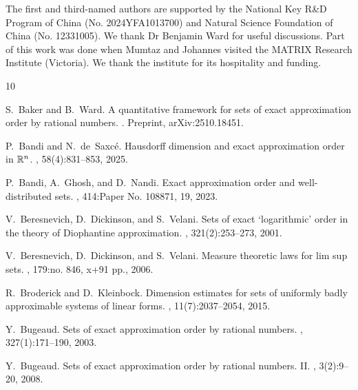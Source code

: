 \documentclass[11pt]{amsart}
\numberwithin{equation}{section}
\newcommand{\0}{\mathbf{0}}
\theoremstyle{remark}
\begin{document}
{\medskip

 The first and third-named authors are supported by the National Key R\&D Program of China (No. 2024YFA1013700) and Natural Science Foundation of China (No. 12331005). We thank Dr Benjamin Ward for useful discussions. Part of this work was done when Mumtaz and Johannes visited the MATRIX Research Institute (Victoria). We thank the institute for its hospitality and funding.


% 

% 

\begin{thebibliography}{10}

S.~Baker and B.~Ward.
\newblock A quantitative framework for sets of exact approximation order by
  rational numbers.
.
\newblock Preprint, arXiv:2510.18451.

P.~Bandi and N.~de~Saxc\'e.
\newblock Hausdorff dimension and exact approximation order in {$\Bbb R^n$}.
, 58(4):831--853, 2025.

P.~Bandi, A.~Ghosh, and D.~Nandi.
\newblock Exact approximation order and well-distributed sets.
, 414:Paper No. 108871, 19, 2023.

V.~Beresnevich, D.~Dickinson, and S.~Velani.
\newblock Sets of exact `logarithmic' order in the theory of {D}iophantine
  approximation.
, 321(2):253--273, 2001.

V.~Beresnevich, D.~Dickinson, and S.~Velani.
\newblock Measure theoretic laws for lim sup sets.
, 179:no. 846, x+91 pp., 2006.

R.~Broderick and D.~Kleinbock.
\newblock Dimension estimates for sets of uniformly badly approximable systems
  of linear forms.
, 11(7):2037--2054, 2015.

Y.~Bugeaud.
\newblock Sets of exact approximation order by rational numbers.
, 327(1):171--190, 2003.

Y.~Bugeaud.
\newblock Sets of exact approximation order by rational numbers. {II}.
, 3(2):9--20, 2008.


\end{thebibliography}}
\end{document}
